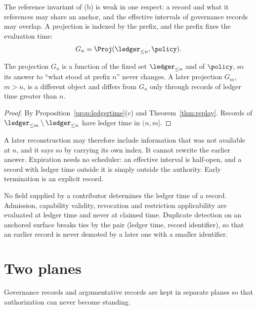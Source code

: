 The reference invariant of (b) is weak in one respect: a record and what it references may share an anchor, and the effective intervals of governance records may overlap. A projection is indexed by the prefix, and the prefix fixes the evaluation time:
\[
G_n=\Proj(\ledger_{\le n},\policy).
\]

\begin{proposition}\label{prop:prefix}
The projection $G_n$ is a function of the fixed set $\ledger_{\le n}$ and of $\policy$, so its answer to ``what stood at prefix $n$'' never changes. A later projection $G_m$, $m>n$, is a different object and differs from $G_n$ only through records of ledger time greater than $n$.
\end{proposition}

\begin{proof}
By Proposition~\ref{prop:ledgertime}(c) and Theorem~\ref{thm:replay}. Records of $\ledger_{\le m}\setminus\ledger_{\le n}$ have ledger time in $(n,m]$.
\end{proof}

A later reconstruction may therefore include information that was not available at $n$, and it says so by carrying its own index. It cannot rewrite the earlier answer. Expiration needs no scheduler: an effective interval is half-open, and a record with ledger time outside it is simply outside the authority. Early termination is an explicit record.

\begin{designrule}\label{rule:time}
No field supplied by a contributor determines the ledger time of a record. Admission, capability validity, revocation and restriction applicability are evaluated at ledger time and never at claimed time. Duplicate detection on an anchored surface breaks ties by the pair (ledger time, record identifier), so that an earlier record is never demoted by a later one with a smaller identifier.
\end{designrule}

\section{Two planes}\label{sec:planes}

Governance records and argumentative records are kept in separate planes so that authorization can never become standing.

